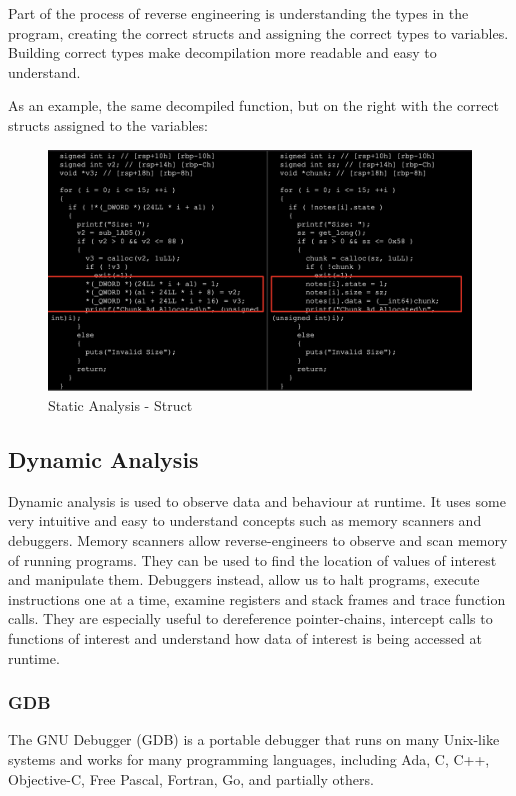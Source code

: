 \documentclass{article}
\begin{document}
Part of the process of reverse engineering is understanding the types in the program, creating the correct
structs and assigning the correct types to variables. Building correct types make decompilation more readable
and easy to understand.

As an example, the same decompiled function, but on the right with the correct structs assigned to the variables:
\begin{figure}[H]
\centering
\includegraphics[width=1\textwidth]{img/struct.jpg}
\caption{Static Analysis - Struct}
\label{fig:struct}
\end{figure}

\subsection{Dynamic Analysis}

Dynamic analysis is used to observe data and behaviour at runtime. It uses some very intuitive and easy to 
understand concepts such as memory scanners and debuggers. Memory scanners allow reverse-engineers to observe 
and scan memory of running programs. They can be used to find the location of values of interest and manipulate them.
Debuggers instead, allow us to halt programs, execute instructions one at a time, examine registers and stack frames 
and trace function calls. They are especially useful to dereference pointer-chains, intercept calls to functions 
of interest and understand how data of interest is being accessed at runtime.

\subsubsection{GDB}

The GNU Debugger (GDB) is a portable debugger that runs on many Unix-like systems and works for many programming 
languages, including Ada, C, C++, Objective-C, Free Pascal, Fortran, Go, and partially others.
\end{document}
